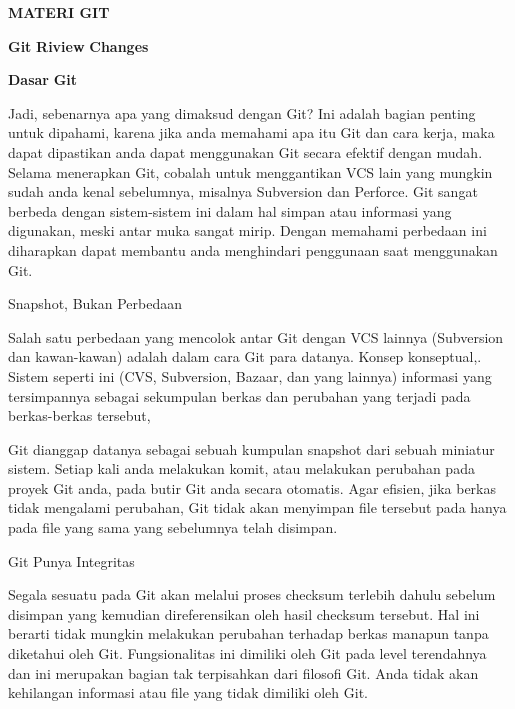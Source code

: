 
\sloppy
\begin{center}{\fontsize{16pt}{16pt}\selectfont \textbf{MATERI GIT} \\}\end{center} \par
\noindent 
\begin{center}{\fontsize{14pt}{14pt}\selectfont \textbf{Git}\textbf{ }\textbf{Riview}\textbf{ Changes} \\}\end{center} \par
\vspace{12pt}
\noindent 
{\fontsize{14pt}{14pt}\selectfont \textbf{Dasar}\textbf{ }\textbf{Git} \\} \par
\noindent 
Jadi, sebenarnya apa yang dimaksud dengan Git? Ini adalah bagian penting untuk dipahami, karena jika anda memahami apa itu Git dan cara kerja, maka dapat dipastikan anda dapat menggunakan Git secara efektif dengan mudah. Selama menerapkan Git, cobalah untuk menggantikan VCS lain yang mungkin sudah anda kenal sebelumnya, misalnya Subversion dan Perforce. Git sangat berbeda dengan sistem-sistem ini dalam hal simpan atau informasi yang digunakan, meski antar muka sangat mirip. Dengan memahami perbedaan ini diharapkan dapat membantu anda menghindari penggunaan saat menggunakan Git. \par
\noindent 
Snapshot, Bukan Perbedaan \par
\noindent 
Salah satu perbedaan yang mencolok antar Git dengan VCS lainnya (Subversion dan kawan-kawan) adalah dalam cara Git para datanya. Konsep konseptual,. Sistem seperti ini (CVS, Subversion, Bazaar, dan yang lainnya) informasi yang tersimpannya sebagai sekumpulan berkas dan perubahan yang terjadi pada berkas-berkas tersebut, \par
\noindent 
Git dianggap datanya sebagai sebuah kumpulan snapshot dari sebuah miniatur sistem. Setiap kali anda melakukan komit, atau melakukan perubahan pada proyek Git anda, pada butir Git anda secara otomatis. Agar efisien, jika berkas tidak mengalami perubahan, Git tidak akan menyimpan file tersebut pada hanya pada file yang sama yang sebelumnya telah disimpan. \par
\vspace{12pt}
\noindent 
Git Punya Integritas \par
\noindent 
Segala sesuatu pada Git akan melalui proses checksum terlebih dahulu sebelum disimpan yang kemudian direferensikan oleh hasil checksum tersebut. Hal ini berarti tidak mungkin melakukan perubahan terhadap berkas manapun tanpa diketahui oleh Git. Fungsionalitas ini dimiliki oleh Git pada level terendahnya dan ini merupakan bagian tak terpisahkan dari filosofi Git. Anda tidak akan kehilangan informasi atau file yang tidak dimiliki oleh Git. \par
